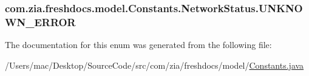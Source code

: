 \hypertarget{enumcom_1_1zia_1_1freshdocs_1_1model_1_1_constants_1_1_network_status_a6beb7c40289fe14978d18e7cbc869af4}{
\subsubsection[{U\-N\-K\-N\-O\-W\-N\-\_\-\-E\-R\-R\-O\-R}]{\setlength{\rightskip}{0pt plus 5cm}com.\-zia.\-freshdocs.\-model.\-Constants.\-Network\-Status.\-U\-N\-K\-N\-O\-W\-N\-\_\-\-E\-R\-R\-O\-R}}\label{enumcom_1_1zia_1_1freshdocs_1_1model_1_1_constants_1_1_network_status_a6beb7c40289fe14978d18e7cbc869af4}


The documentation for this enum was generated from the following file\-:\begin{DoxyCompactItemize}
\item 
/\-Users/mac/\-Desktop/\-Source\-Code/src/com/zia/freshdocs/model/\hyperlink{_constants_8java}{Constants.\-java}\end{DoxyCompactItemize}
